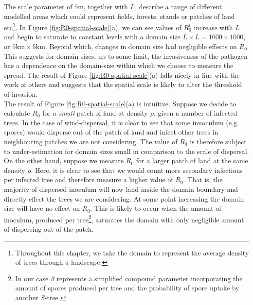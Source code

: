 The scale parameter of $5\mathrm{m}$, together with $L$, describe a range of different modelled %
areas which could represent fields, forests, stands or patches of land etc\footnote{Throughout this chapter, %
we take the domain to represent the average density of trees through a landscape.}. %
In Figure \ref{fig:R0-spatial-scale}(a), we can see values of $R_0^i$ increase with $L$ and %
begin to saturate to constant levels with a domain size $L\times L=1000\times 1000$, or $5\mathrm{km}\times 5 \mathrm{km}$. %
Beyond which, changes in domain size had negligible effects on $R_0$. %
This suggests for domain-sizes, up to some limit, the invasiveness of the pathogen has a %
dependence on the domain-size within which we choose to measure the spread. %
The result of Figure \ref{fig:R0-spatial-scale}(a) falls nicely in line with the work of %
others \cite{mikaberidze2016invasiveness} and suggests that the spatial scale is likely to %
alter the threshold of invasion.\\

The result of Figure \ref{fig:R0-spatial-scale}(a) is intuitive. %
Suppose we decide to calculate $R_0$ for a \textit{small} patch of land at density $\rho$, %
given a number of infected trees. In the case of wind-dispersal, it is clear to see that some %
innoculum (e.g. spores) would disperse out of the patch of land and infect other trees in %
neighbouring patches we are not considering. The value of $R_0$ is therefore subject to %
under-estimation for domain sizes small in comparison to the scale of dispersal.\\ 

On the other hand, suppose we measure $R_0$ for a larger patch of land at the same density $\rho$. Here, it is clear to see that we would count more secondary infections per infected tree and therefore measure a higher value of $R_0$. That is, the majority of dispersed inoculum will now land inside the domain boundary and directly effect the trees we are considering. At some point increasing the domain size will have no effect on $R_0$. This is likely to occur when the amount of inoculum, produced per tree\footnote{In our case $\beta$ represents a simplified compound parameter incorporating the amount of spores produced per tree and the probability of spore uptake by another $S$-tree.}, saturates the domain with only negligible amount of dispersing out of the patch.\\

